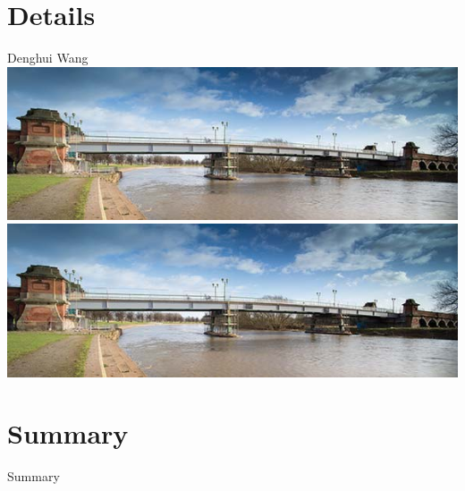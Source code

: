 \documentclass[11pt]{beamer}
\begin{document}
\section{Details}



\begin{frame}{Denghui Wang}%
	\centering
	\includegraphics[height=.35\textheight]{pic/Bridge01.jpg}
	\includegraphics[height=.4\textheight]{pic/Bridge01.jpg} 
\end{frame}

\section{Summary}


	\begin{frame}{Summary}
	\end{frame}


\end{document}
